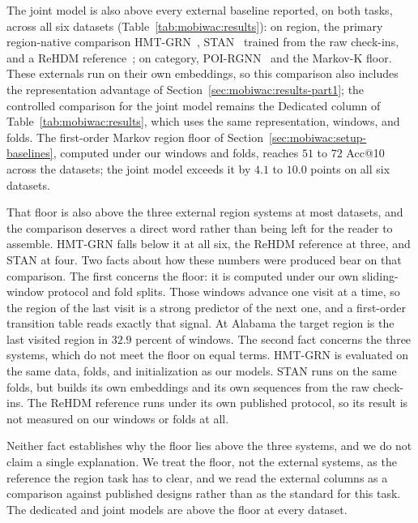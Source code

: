 The joint model is also above every external baseline reported, on both tasks,
across all six datasets (Table~\ref{tab:mobiwac:results}): on region, the primary
region-native comparison HMT-GRN~\cite{Lim2022}, STAN~\cite{luo2021stan}
trained from the raw check-ins, and a ReHDM reference~\cite{li2025rehdm}; on
category, POI-RGNN~\cite{capanema2023poirgnn} and the Markov-K floor. These externals run on their own embeddings, so this comparison
also includes the representation advantage of Section~\ref{sec:mobiwac:results-part1}; the
controlled comparison for the joint model remains the Dedicated column of
Table~\ref{tab:mobiwac:results}, which uses the same representation, windows, and
folds. The first-order Markov region floor of Section~\ref{sec:mobiwac:setup-baselines},
computed under our windows and folds, reaches $51$ to $72$ Acc@10 across the
datasets; the joint model exceeds it by $4.1$ to $10.0$ points on all six
datasets.

That floor is also above the three external region systems at most datasets, and the
comparison deserves a direct word rather than being left for the reader to assemble.
HMT-GRN falls below it at all six, the ReHDM reference at three, and STAN at four. Two
facts about how these numbers were produced bear on that comparison. The first concerns
the floor: it is computed under our own sliding-window protocol and fold splits. Those
windows advance one visit at a time, so the region of the last visit is a strong predictor
of the next one, and a first-order transition table reads exactly that signal. At Alabama the target region is the last visited region in $32.9$ percent of
windows.
The second
fact concerns the three systems, which do not meet the floor on equal terms. HMT-GRN is
evaluated on the same data, folds, and initialization as our models. STAN runs on the same
folds, but builds its own embeddings and its own sequences from the raw check-ins. The
ReHDM reference runs under its own published protocol, so its result is not measured on our
windows or folds at all.

Neither fact establishes why the floor lies above the three systems, and we do not claim a
single explanation. We treat the floor, not the external systems, as the reference the
region task has to clear, and we read the external columns as a comparison against
published designs rather than as the standard for this task. The dedicated and joint
models are above the floor at every dataset.


